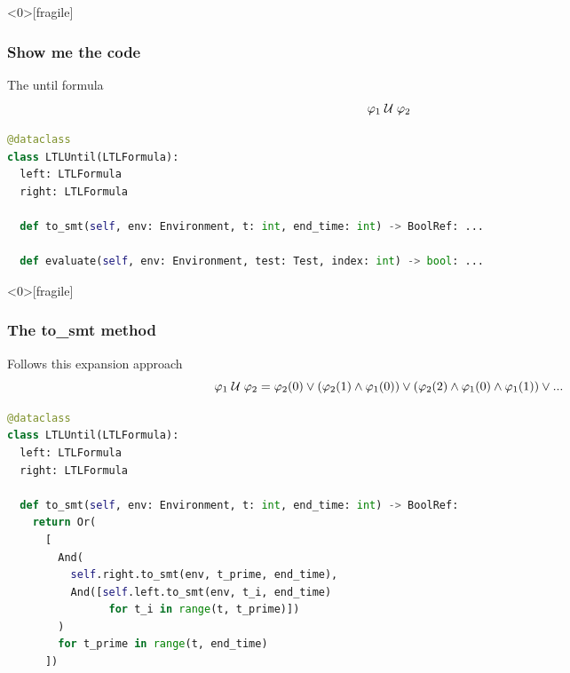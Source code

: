 \begin{frame}<0>[fragile]
  \frametitle{Show me the code} \small

\begin{block}{The until formula}
\[
\varphi_1 \;{\cal U}\; \varphi_2
\]
\end{block}

\begin{lstlisting}[language=python,frame=single]
@dataclass
class LTLUntil(LTLFormula):
  left: LTLFormula
  right: LTLFormula

  def to_smt(self, env: Environment, t: int, end_time: int) -> BoolRef: ...

  def evaluate(self, env: Environment, test: Test, index: int) -> bool: ...
\end{lstlisting}

\end{frame}


\begin{frame}<0>[fragile]
  \frametitle{The to\_smt method} \small

\begin{block}{Follows this expansion approach}
\[
\varphi_1 \;{\cal U}\; \varphi_2 = 
  \varphi_2(0) 
  \vee (\varphi_2(1) \wedge \varphi_1(0))  
  \vee (\varphi_2(2) \wedge \varphi_1(0) \wedge \varphi_1(1))
  \vee ...
\]
\end{block}

\begin{lstlisting}[language=python,frame=single]
@dataclass
class LTLUntil(LTLFormula):
  left: LTLFormula
  right: LTLFormula

  def to_smt(self, env: Environment, t: int, end_time: int) -> BoolRef:
    return Or(
      [
        And(
          self.right.to_smt(env, t_prime, end_time),
          And([self.left.to_smt(env, t_i, end_time) 
                for t_i in range(t, t_prime)])
        )
        for t_prime in range(t, end_time)
      ])
\end{lstlisting}

\end{frame}


